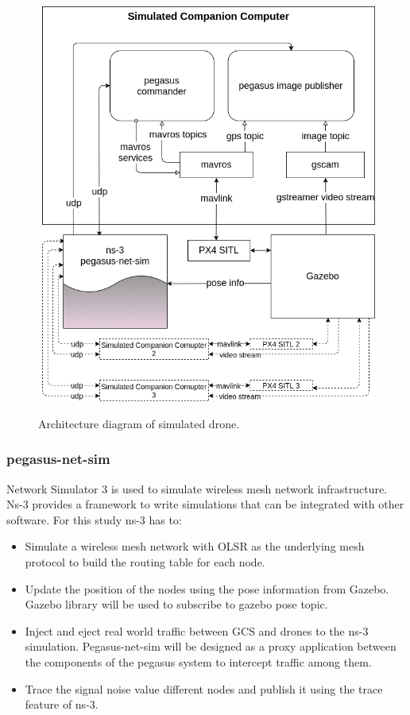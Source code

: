 \begin{figure}
	\centering
	\caption[Pegasus GCS system simulation overview]{\small Architecture diagram of simulated drone.}
	\includegraphics[width=5in]{figures/methodology/methodology-drone-components-simulated}
	\label{fig:drone-components-simulated}
\end{figure}


\subsubsection{pegasus-net-sim}

Network Simulator 3 is used to simulate wireless mesh network infrastructure. Ns-3 provides a framework to write simulations that can be integrated with other software. For this study ns-3 has to:
\begin{itemize}
	\item Simulate a wireless mesh network with OLSR as the underlying mesh protocol to build the routing table for each node.
	\item Update the position of the nodes using the pose information from Gazebo. Gazebo library will be used to subscribe to gazebo pose topic.
	\item Inject and eject real world traffic between GCS and drones to the ns-3 simulation. Pegasus-net-sim will be designed as a proxy application between the components of the pegasus system to intercept traffic among them.
	\item Trace the signal noise value different nodes and publish it using the trace feature of ns-3.
\end{itemize}

